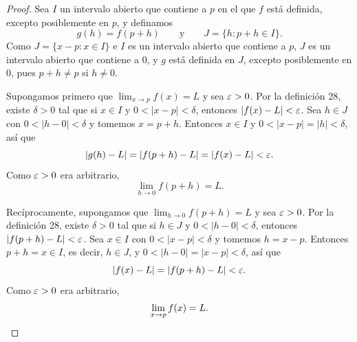 \documentclass[12pt,a4paper]{article}
\begin{document}
    \begin{proof}
        Sea $I$ un intervalo abierto que contiene a $p$ en el que $f$ está definida, excepto posiblemente en $p$, y definamos
        \begin{equation*}
            g(h)=f(p+h)\qquad\text{y}\qquad J=\{h:p+h\in I\}.
        \end{equation*}
        Como $J=\{x-p:x\in I\}$ e $I$ es un intervalo abierto que contiene a $p$, $J$ es un intervalo abierto que contiene a $0$, y $g$ está definida en $J$, excepto posiblemente en $0$, pues $p+h\neq p$ si $h\neq0$.

        Supongamos primero que $\lim_{x\to p}f(x)=L$ y sea $\varepsilon>0$. Por la definición 28, existe $\delta>0$ tal que si $x\in I$ y $0<|x-p|<\delta$, entonces $|f(x)-L|<\varepsilon$. Sea $h\in J$ con $0<|h-0|<\delta$ y tomemos $x=p+h$. Entonces $x\in I$ y $0<|x-p|=|h|<\delta$, así que
        \begin{equation*}
            |g(h)-L|=|f(p+h)-L|=|f(x)-L|<\varepsilon.
        \end{equation*}
        Como $\varepsilon>0$ era arbitrario,
        \begin{equation*}
            \lim_{h\to0}f(p+h)=L.
        \end{equation*}

        Recíprocamente, supongamos que $\lim_{h\to0}f(p+h)=L$ y sea $\varepsilon>0$. Por la definición 28, existe $\delta>0$ tal que si $h\in J$ y $0<|h-0|<\delta$, entonces $|f(p+h)-L|<\varepsilon$. Sea $x\in I$ con $0<|x-p|<\delta$ y tomemos $h=x-p$. Entonces $p+h=x\in I$, es decir, $h\in J$, y $0<|h-0|=|x-p|<\delta$, así que
        \begin{equation*}
            |f(x)-L|=|f(p+h)-L|<\varepsilon.
        \end{equation*}
        Como $\varepsilon>0$ era arbitrario,
        \begin{equation*}
            \lim_{x\to p}f(x)=L.\qedhere
        \end{equation*}
    \end{proof}
\end{document}
